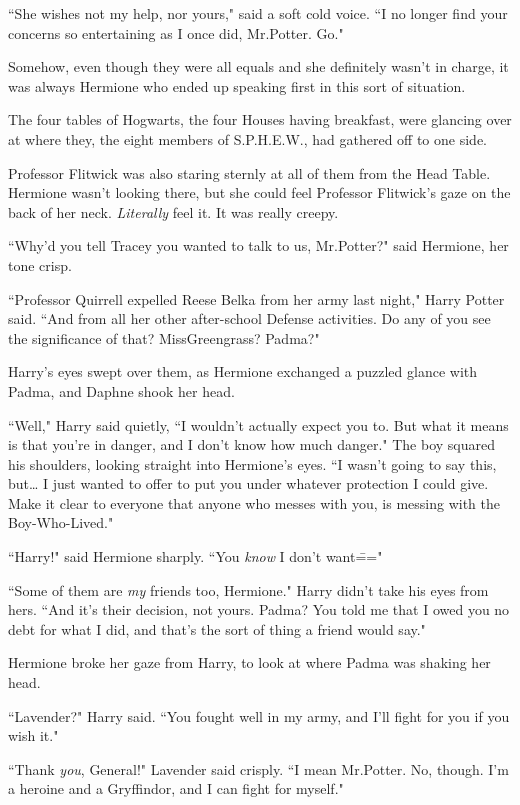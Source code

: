 ``She wishes not my help, nor yours," said a soft cold voice. ``I no longer find your concerns so entertaining as I once did, Mr.\?Potter. Go."

\later

Somehow, even though they were all equals and she definitely wasn't in charge, it was always Hermione who ended up speaking first in this sort of situation.

The four tables of Hogwarts, the four Houses having breakfast, were glancing over at where they, the eight members of S.P.H.E.W., had gathered off to one side.

Professor Flitwick was also staring sternly at all of them from the Head Table. Hermione wasn't looking there, but she could feel Professor Flitwick's gaze on the back of her neck. \emph{Literally} feel it. It was really creepy.

``Why'd you tell Tracey you wanted to talk to us, Mr.\?Potter?" said Hermione, her tone crisp.

``Professor Quirrell expelled Reese Belka from her army last night," Harry Potter said. ``And from all her other after-school Defense activities. Do any of you see the significance of that? Miss\?Greengrass? Padma?"

Harry's eyes swept over them, as Hermione exchanged a puzzled glance with Padma, and Daphne shook her head.

``Well," Harry said quietly, ``I wouldn't actually expect you to. But what it means is that you're in danger, and I don't know how much danger." The boy squared his shoulders, looking straight into Hermione's eyes. ``I wasn't going to say this, but{\ldots} I just wanted to offer to put you under whatever protection I could give. Make it clear to everyone that anyone who messes with you, is messing with the Boy-Who-Lived."

``Harry!" said Hermione sharply. ``You \emph{know} I don't want\==="

``Some of them are \emph{my} friends too, Hermione." Harry didn't take his eyes from hers. ``And it's their decision, not yours. Padma? You told me that I owed you no debt for what I did, and that's the sort of thing a friend would say."

Hermione broke her gaze from Harry, to look at where Padma was shaking her head.

``Lavender?" Harry said. ``You fought well in my army, and I'll fight for you if you wish it."

``Thank \emph{you}, General!" Lavender said crisply. ``I mean Mr.\?Potter. No, though. I'm a heroine and a Gryffindor, and I can fight for myself."

